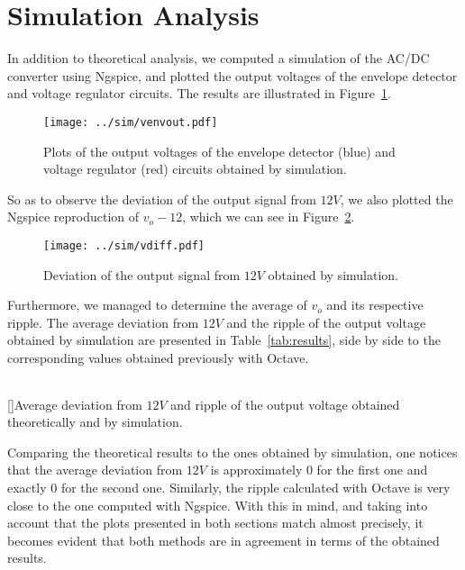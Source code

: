 \section{Simulation Analysis}
\label{sec:simulation}

In addition to theoretical analysis, we computed a simulation of the AC/DC converter using Ngspice, and plotted the output voltages of the envelope detector and voltage regulator circuits. The results are illustrated in Figure~\ref{fig:venvout}.

\vspace{-30mm}

\begin{figure}[H] \centering
\texttt{[image: ../sim/venvout.pdf]}
\caption{Plots of the output voltages of the envelope detector (blue) and voltage regulator (red) circuits obtained by simulation.}
\label{fig:venvout}
\end{figure}

So as to observe the deviation of the output signal from $12V$, we also plotted the Ngspice reproduction of $v_o-12$, which we can see in Figure~\ref{fig:vdiff}.

\vspace{-20mm}

\begin{figure}[H] \centering
\texttt{[image: ../sim/vdiff.pdf]}
\caption{Deviation of the output signal from $12V$ obtained by simulation.}
\label{fig:vdiff}
\end{figure}

Furthermore, we managed to determine the average of $v_o$ and its respective ripple. The average deviation from $12V$ and the ripple of the output voltage obtained by simulation are presented in Table~\ref{tab:results}, side by side to the corresponding values obtained previously with Octave.

\vspace{2mm}

\begin{center}
\begin{tabular}{ | c | c | c | }\hline
 
\end{tabular}
[]{Average deviation from $12V$ and ripple of the output voltage obtained theoretically and by simulation.}
\label{tab:results}
\end{center}

\vspace{2mm}

Comparing the theoretical results to the ones obtained by simulation, one notices that the average deviation from $12V$ is approximately $0$ for the first one and exactly $0$ for the second one. Similarly, the ripple calculated with Octave is very close to the one computed with Ngspice. With this in mind, and taking into account that the plots presented in both sections match almost precisely, it becomes evident that both methods are in agreement in terms of the obtained results.\\

